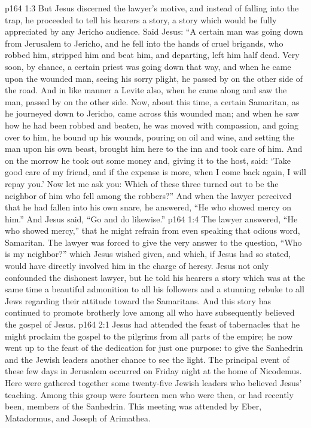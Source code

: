 \vs p164 1:3 But Jesus discerned the lawyer’s motive, and instead of falling into the trap, he proceeded to tell his hearers a story, a story which would be fully appreciated by any Jericho audience. Said Jesus: \textcolor{ubdarkred}{“A certain man was going down from Jerusalem to Jericho, and he fell into the hands of cruel brigands, who robbed him, stripped him and beat him, and departing, left him half dead. Very soon, by chance, a certain priest was going down that way, and when he came upon the wounded man, seeing his sorry plight, he passed by on the other side of the road. And in like manner a Levite also, when he came along and saw the man, passed by on the other side. Now, about this time, a certain Samaritan, as he journeyed down to Jericho, came across this wounded man; and when he saw how he had been robbed and beaten, he was moved with compassion, and going over to him, he bound up his wounds, pouring on oil and wine, and setting the man upon his own beast, brought him here to the inn and took care of him. And on the morrow he took out some money and, giving it to the host, said: ‘Take good care of my friend, and if the expense is more, when I come back again, I will repay you.’ Now let me ask you: Which of these three turned out to be the neighbor of him who fell among the robbers?”} And when the lawyer perceived that he had fallen into his own snare, he answered, “He who showed mercy on him.” And Jesus said, \textcolor{ubdarkred}{“Go and do likewise.”}
\vs p164 1:4 The lawyer answered, “He who showed mercy,” that he might refrain from even speaking that odious word, Samaritan. The lawyer was forced to give the very answer to the question, “Who is my neighbor?” which Jesus wished given, and which, if Jesus had so stated, would have directly involved him in the charge of heresy. Jesus not only confounded the dishonest lawyer, but he told his hearers a story which was at the same time a beautiful admonition to all his followers and a stunning rebuke to all Jews regarding their attitude toward the Samaritans. And this story has continued to promote brotherly love among all who have subsequently believed the gospel of Jesus.
\vs p164 2:1 Jesus had attended the feast of tabernacles that he might proclaim the gospel to the pilgrims from all parts of the empire; he now went up to the feast of the dedication for just one purpose: to give the Sanhedrin and the Jewish leaders another chance to see the light. The principal event of these few days in Jerusalem occurred on Friday night at the home of Nicodemus. Here were gathered together some twenty\hyp{}five Jewish leaders who believed Jesus’ teaching. Among this group were fourteen men who were then, or had recently been, members of the Sanhedrin. This meeting was attended by Eber, Matadormus, and Joseph of Arimathea.
